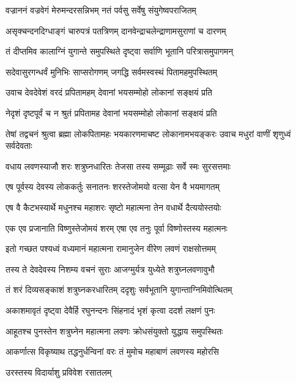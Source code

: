 \twolineshloka
{वज्राननं वज्रवेगं मेरुमन्दरसन्निभम्}
{नतं पर्वसु सर्वेषु संयुगेष्वपराजितम्} %

\twolineshloka
{असृक्चन्दनदिग्धाङ्गं चारुपत्रं पतत्रिणम्}
{दानवेन्द्राचलेन्द्राणामसुराणां च दारणम्} %

\twolineshloka
{तं दीप्तमिव कालाग्निं युगान्ते समुपस्थिते}
{दृष्ट्वा सर्वाणि भूतानि परित्रासमुपागमन्} %

\twolineshloka
{सदेवासुरगन्धर्वं मुनिभिः साप्सरोगणम्}
{जगद्धि सर्वमस्वस्थं पितामहमुपस्थितम्} %

\twolineshloka
{उवाच देवदेवेशं वरदं प्रपितामहम्}
{देवानां भयसम्मोहो लोकानां सङ्क्षयं प्रति} %

\twolineshloka
{नेदृशं दृष्टपूर्वं च न श्रुतं प्रपितामह}
{देवानां भयसम्मोहो लोकानां सङ्क्षयं प्रति} %

\threelineshloka
{तेषां तद्वचनं श्रुत्वा ब्रह्मा लोकपितामहः}
{भयकारणमाचष्ट लोकानामभयङ्करः}
{उवाच मधुरां वाणीं शृणुध्वं सर्वदेवताः} %

\twolineshloka
{वधाय लवणस्याजौ शरः शत्रुघ्नधारितः}
{तेजसा तस्य सम्मूढाः सर्वे स्मः सुरसत्तमाः} %

\twolineshloka
{एष पूर्वस्य देवस्य लोककर्तुः सनातनः}
{शरस्तेजोमयो वत्सा येन वै भयमागतम्} %

\twolineshloka
{एष वै कैटभस्यार्थे मधुनश्च महाशरः}
{सृष्टो महात्मना तेन वधार्थे दैत्ययोस्तयोः} %

\twolineshloka
{एक एव प्रजानाति विष्णुस्तेजोमयं शरम्}
{एषा एव तनुः पूर्वा विष्णोस्तस्य महात्मनः} %

\twolineshloka
{इतो गच्छत पश्यध्वं वध्यमानं महात्मना}
{रामानुजेन वीरेण लवणं राक्षसोत्तमम्} %

\twolineshloka
{तस्य ते देवदेवस्य निशम्य वचनं सुराः}
{आजग्मुर्यत्र युध्येते शत्रुघ्नलवणावुभौ} %

\twolineshloka
{तं शरं दिव्यसङ्काशं शत्रुघ्नकरधारितम्}
{ददृशुः सर्वभूतानि युगान्ताग्निमिवोत्थितम्} %

\twolineshloka
{अकाशमावृतं दृष्ट्वा देवैर्हि रघुनन्दनः}
{सिंहनादं भृशं कृत्वा ददर्श लक्षणं पुनः} %

\twolineshloka
{आहूतश्च पुनस्तेन शत्रुघ्नेन महात्मना}
{लवणः क्रोधसंयुक्तो युद्धाय समुपस्थितः} %

\twolineshloka
{आकर्णात्स विकृष्याथ तद्धनुर्धन्विनां वरः}
{तं मुमोच महाबाणं लवणस्य महोरसि} %

\onelineshloka
{उरस्तस्य विदार्याशु प्रविवेश रसातलम्} %

